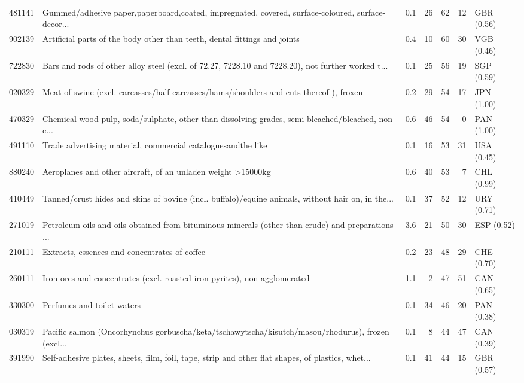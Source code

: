\begin{tabular}{@{}l p{6.4cm} r r r r l@{}}
481141 & Gummed/\allowbreak{}adhesive paper,paperboard,coated, impregnated, covered, surface-coloured, surface-decor... & 0.1 & 26 & 62 & 12 & GBR (0.56) \\
902139 & Artificial parts of the body other than teeth, dental fittings and joints & 0.4 & 10 & 60 & 30 & VGB (0.46) \\
722830 & Bars and rods of other alloy steel (excl. of 72.27, 7228.10 and 7228.20), not further worked t... & 0.1 & 25 & 56 & 19 & SGP (0.59) \\
020329 & Meat of swine (excl. carcasses/\allowbreak{}half-carcasses/\allowbreak{}hams/\allowbreak{}shoulders and cuts thereof ), froxen & 0.2 & 29 & 54 & 17 & JPN (1.00) \\
470329 & Chemical wood pulp, soda/\allowbreak{}sulphate, other than dissolving grades, semi-bleached/\allowbreak{}bleached, non-c... & 0.6 & 46 & 54 & 0 & PAN (1.00) \\
491110 & Trade advertising material, commercial cataloguesandthe like & 0.1 & 16 & 53 & 31 & USA (0.45) \\
880240 & Aeroplanes and other aircraft, of an unladen weight >15000kg & 0.6 & 40 & 53 & 7 & CHL (0.99) \\
410449 & Tanned/\allowbreak{}crust hides and skins of bovine (incl. buffalo)/\allowbreak{}equine animals, without hair on, in the... & 0.1 & 37 & 52 & 12 & URY (0.71) \\
271019 & Petroleum oils and oils obtained from bituminous minerals (other than crude) and preparations ... & 3.6 & 21 & 50 & 30 & ESP (0.52) \\
210111 & Extracts, essences and concentrates of coffee & 0.2 & 23 & 48 & 29 & CHE (0.70) \\
260111 & Iron ores and concentrates (excl. roasted iron pyrites), non-agglomerated & 1.1 & 2 & 47 & 51 & CAN (0.65) \\
330300 & Perfumes and toilet waters & 0.1 & 34 & 46 & 20 & PAN (0.38) \\
030319 & Pacific salmon (Oncorhynchus gorbuscha/\allowbreak{}keta/\allowbreak{}tschawytscha/\allowbreak{}kisutch/\allowbreak{}masou/\allowbreak{}rhodurus), frozen (excl... & 0.1 & 8 & 44 & 47 & CAN (0.39) \\
391990 & Self-adhesive plates, sheets, film, foil, tape, strip and other flat shapes, of plastics, whet... & 0.1 & 41 & 44 & 15 & GBR (0.57) \\
\bottomrule
\end{tabular}

